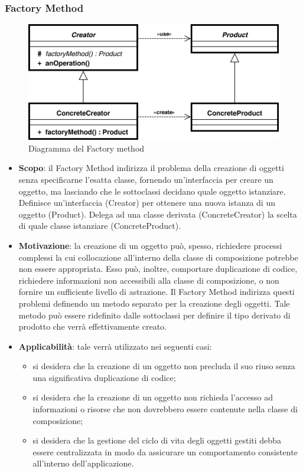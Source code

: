 		\subsubsection{Factory Method}
		\begin{figure}[H]
		\centering
		\includegraphics[width=0.5\linewidth]{GraficiAppendici/factory.png}
		\caption{Diagramma del  Factory method}
	\end{figure}
		\begin{itemize}
		\item \textbf{Scopo}: il  Factory Method indirizza il problema della creazione
di oggetti senza specificarne l’esatta classe, fornendo un’interfaccia per creare un oggetto, ma lasciando che le sottoclassi decidano quale oggetto istanziare. Definisce un’interfaccia (Creator) per ottenere una nuova istanza di un oggetto (Product). Delega ad una classe derivata (ConcreteCreator) la scelta di quale classe istanziare (ConcreteProduct).
		\item \textbf{Motivazione}: la creazione di un oggetto può, spesso, richiedere processi complessi la cui collocazione all’interno della classe di composizione potrebbe non essere appropriata. Esso può, inoltre, comportare duplicazione di codice, richiedere informazioni non accessibili alla classe di composizione, o non fornire un sufficiente livello di astrazione.
Il Factory Method indirizza questi problemi definendo un metodo separato per la creazione degli oggetti. Tale metodo può essere ridefinito dalle sottoclassi per definire il tipo derivato di prodotto che verrà effettivamente creato.
		\item \textbf{Applicabilità}: tale  verrà utilizzato nei seguenti casi:
		\begin{itemize}
		\item si desidera che la creazione di un oggetto non precluda il suo riuso senza una significativa duplicazione di codice;
		\item si desidera che la creazione di un oggetto non richieda l’accesso ad informazioni o risorse che non dovrebbero essere contenute nella classe di composizione;
		\item si desidera che la gestione del ciclo di vita degli oggetti gestiti debba essere centralizzata in modo da assicurare un comportamento consistente all’interno dell’applicazione.
		\end{itemize}
		\end{itemize}

